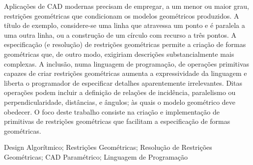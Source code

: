 \begin{resumo}
\noindent
Aplicações de \acl{CAD} modernas precisam de empregar, a um menor ou maior grau,
restrições geométricas que condicionam os modelos geométricos produzidos.  A
título de exemplo, considere-se uma linha que atravessa um ponto e é paralela a
uma outra linha, ou a construção de um círculo com recurso a três pontos.  A
especificação (e resolução) de restrições geométricas permite a criação de
formas geométricas que, de outro modo, exigiriam descrições substancialmente
mais complexas.  A inclusão, numa linguagem de programação, de operações
primitivas capazes de criar restrições geométricas aumenta a expressividade da
linguagem e liberta o programador de especificar detalhes aparentemente
irrelevantes.  Ditas operações podem incluir a definição de relações de
incidência, paralelismo ou perpendicularidade, distâncias, e ângulos; às quais o
modelo geométrico deve obedecer.  O foco deste trabalho consiste na criação e
implementação de primitivas de restrições geométricas que facilitam a
especificação de formas geométricas.

\end{resumo}

\begin{palavraschave}
\noindent
Design Algorítmico;
Restrições Geométricas;
Resolução de Restrições Geométricas;
\acs{CAD} Paramétrico;
Linguagem de Programação
\end{palavraschave}

\clearpage
\thispagestyle{empty}
